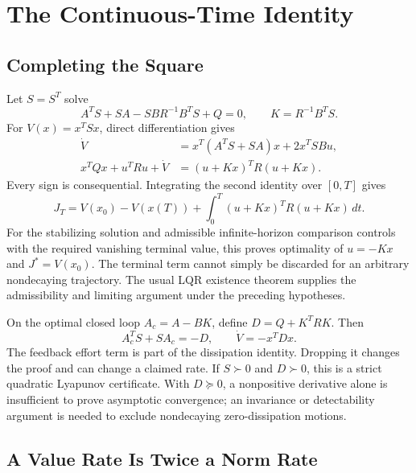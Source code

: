 \section{The Continuous-Time Identity}

\subsection{Completing the Square}

Let $S=S^T$ solve
\begin{equation}
A^TS+SA-SBR^{-1}B^TS+Q=0,
\qquad K=R^{-1}B^TS.
\end{equation}
For $V(x)=x^TSx$, direct differentiation gives
\begin{equation}
\begin{aligned}
\dot V&=x^T(A^TS+SA)x+2x^TSBu,\\
x^TQx+u^TRu+\dot V&=(u+Kx)^TR(u+Kx).
\end{aligned}
\end{equation}
Every sign is consequential. Integrating the second identity over $[0,T]$ gives
\begin{equation}
J_T=V(x_0)-V(x(T))+
\int_0^T(u+Kx)^TR(u+Kx)\,dt.
\end{equation}
For the stabilizing solution and admissible infinite-horizon comparison controls with the required vanishing terminal value, this proves optimality of $u=-Kx$ and $J^*=V(x_0)$. The terminal term cannot simply be discarded for an arbitrary nondecaying trajectory. The usual LQR existence theorem supplies the admissibility and limiting argument under the preceding hypotheses.

On the optimal closed loop $A_c=A-BK$, define $D=Q+K^TRK$. Then
\begin{equation}
A_c^TS+SA_c=-D,\qquad \dot V=-x^TDx.
\end{equation}
The feedback effort term is part of the dissipation identity. Dropping it changes the proof and can change a claimed rate. If $S\succ0$ and $D\succ0$, this is a strict quadratic Lyapunov certificate. With $D\succeq0$, a nonpositive derivative alone is insufficient to prove asymptotic convergence; an invariance or detectability argument is needed to exclude nondecaying zero-dissipation motions.

\subsection{A Value Rate Is Twice a Norm Rate}

